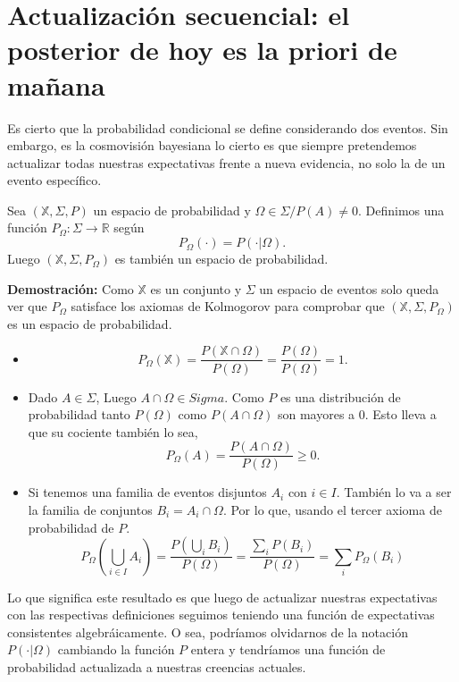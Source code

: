 \section{Actualizaci\'on secuencial: el posterior de hoy es la priori de mañana}
Es cierto que la probabilidad condicional se define considerando dos eventos. Sin embargo, es la cosmovisi\'on bayesiana lo cierto es que siempre pretendemos actualizar todas nuestras expectativas frente a nueva evidencia, no solo la de un evento espec\'ifico.
\begin{theorem}
    Sea $(\mathbb{X},\Sigma,P)$ un espacio de probabilidad y $\Omega\in\Sigma/P(A)\neq 0$. Definimos una funci\'on $P_\Omega:\Sigma\to \mathbb{R}$ seg\'un
    \begin{equation}
        P_\Omega(\cdot) = P(\cdot|\Omega).
    \end{equation}
    Luego $(\mathbb{X},\Sigma,P_\Omega)$ es tambi\'en un espacio de probabilidad.
\end{theorem}
{\bf Demostraci\'on:} Como $\mathbb{X}$ es un conjunto y $\Sigma$ un espacio de eventos solo queda ver que $P_\Omega$ satisface los axiomas de Kolmogorov para comprobar que $(\mathbb{X},\Sigma,P_\Omega)$ es un espacio de probabilidad.
\begin{itemize}
    \item
    $$
        P_\Omega(\mathbb{X}) = \frac{P(\mathbb{X}\cap \Omega)}{P(\Omega)}=\frac{P(\Omega)}{P(\Omega)}=1.
    $$
    \item Dado $A\in \Sigma$, Luego $A\cap \Omega\in Sigma$. Como $P$ es una distribuci\'on de probabilidad tanto $P(\Omega)$ como $P(A\cap \Omega)$ son mayores a 0. Esto lleva a que su cociente tambi\'en lo sea,
    $$
        P_\Omega(A) = \frac{P(A\cap\Omega)}{P(\Omega)}\geq 0.
    $$
    \item Si tenemos una familia de eventos disjuntos $A_i$ con $i\in I$. Tambi\'en lo va a ser la familia de conjuntos $B_i = A_i\cap \Omega$. Por lo que, usando el tercer axioma de probabilidad de $P$.
    $$
        P_\Omega\left( \bigcup_{i\in I} A_i\right) = \frac{P\left(\bigcup_i B_i\right)}{P(\Omega)}= \frac{\sum_i P(B_i)}{P(\Omega)}=\sum_i P_\Omega(B_i)
    $$
\end{itemize}
\QED
Lo que significa este resultado es que luego de actualizar nuestras expectativas con las respectivas definiciones seguimos teniendo una funci\'on de expectativas consistentes algebr\'aicamente. O sea, podr\'iamos olvidarnos de la notaci\'on $P(\cdot|\Omega)$ cambiando la funci\'on $P$ entera y tendr\'iamos una funci\'on de probabilidad actualizada a nuestras creencias actuales. 

